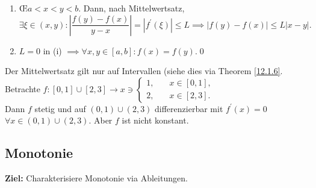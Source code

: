 \begin{subproof*}
	\begin{enumerate}[label=(\roman*)]
		\item \OE $ a < x < y < b $. Dann, nach Mittelwertsatz, 
			\[
				\exists \xi \in (x, y) : \left| \frac{ f(y) - f(x) }{ y - x }  \right| = \left| f^\prime(\xi) \right| \leq L
				\implies \left| f(y) - f(x) \right| \leq L \left| x - y \right| .
			\]
		\item $ L = 0 $ in (i) $ \implies \forall x, y \in [a, b]: f(x) = f(y) $.\qed
	\end{enumerate}
	
\end{subproof*}

\begin{subexample}
	Der Mittelwertsatz gilt nur auf Intervallen (siehe dies via Theorem \ref{12.1.6}.
	Betrachte $ f: [0,1] \cup [2, 3] \to  x \ni \begin{cases}
		1, &\quad x \in [0, 1],\\
		2, &\quad x \in [2, 3].
	\end{cases} $ \\
	Dann $ f $ stetig und auf $ (0, 1) \cup (2, 3) $ differenzierbar mit $ f^\prime(x) = 0 $ $ \forall x \in (0, 1) \cup (2, 3) $. Aber $ f $ ist nicht konstant.
\end{subexample}

\subsection{Monotonie}
\textbf{Ziel:} Charakterisiere Monotonie via Ableitungen.

